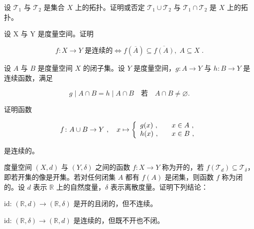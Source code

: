 \begin{exercises}
\item[11.]

设 $ \mathcal{T}_1 $ 与 $ \mathcal{T}_2 $ 是集合 $ X $ 上的拓扑。证明或否定 $ \mathcal{T}_1 \cup \mathcal{T}_2 $ 与 $ \mathcal{T}_1 \cap \mathcal{T}_2 $ 是 $ X $ 上的拓扑。

\item[12.]

设 X 与 Y 是度量空间。证明

\[
f\colon X\to Y\text{ 是连续的}\Longleftrightarrow f(\overline{A})\subseteq\overline{f(A)},\;A\subseteq X\;.
\]
\item[13.]

设 $ A $ 与 $ B $ 是度量空间 $ X $ 的闭子集。设 $ Y $ 是度量空间，$ g: A \to Y $ 与 $ h: B \to Y $ 是连续函数，满足

\[
g\mid A\cap B=h\mid A\cap B\quad\text{若}\quad A\cap B\neq\varnothing.
\]

证明函数

\begin{equation*}
f\colon A\cup B\to Y~,\quad x\mapsto\left\{\begin{array}{l l}{g(x)~,\quad}&{x\in A~,}\\ {h(x)~,\quad}&{x\in B~,}\\ \end{array}\right.
\end{equation*}

是连续的。

\item[14.]

度量空间 $(X,d)$ 与 $(Y,\delta)$ 之间的函数 $f: X \to Y$ 称为开的，若 $f(\mathcal{T}_d) \subseteq \mathcal{T}_\delta$，即若开集的像是开集。若对任何闭集 $A$ 都有 $f(A)$ 是闭集，则函数 $f$ 称为闭的。设 $d$ 表示 $\mathbb{R}$ 上的自然度量，$\delta$ 表示离散度量。证明下列结论：

\begin{items}
\item

id: $ (\mathbb{R}, d) \to (\mathbb{R}, \delta) $ 是开的且闭的，但不连续。

\item

id: $ (\mathbb{R}, \delta) \to (\mathbb{R}, d) $ 是连续的，但既不开也不闭。

\end{items}

\item[15.]


\end{exercises}
